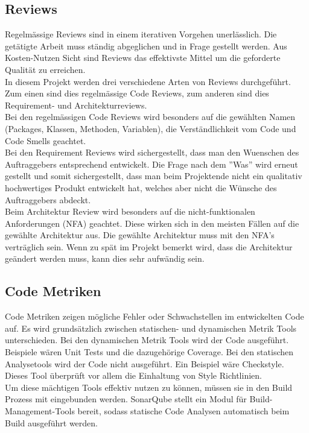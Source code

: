 \subsection{Reviews}
Regelmässige Reviews sind in einem iterativen Vorgehen unerlässlich. Die getätigte Arbeit muss ständig abgeglichen und in Frage gestellt werden. Aus Kosten-Nutzen Sicht sind Reviews das effektivste Mittel um die geforderte Qualität zu erreichen.\\ 

\noindent In diesem Projekt werden drei verschiedene Arten von Reviews durchgeführt. Zum einen sind dies regelmässige Code Reviews, zum anderen sind dies Requirement- und Architekturreviews.\\

\noindent Bei den regelmässigen Code Reviews wird besonders auf die gewählten Namen (Packages, Klassen, Methoden, Variablen), die Verständlichkeit vom Code und Code Smells geachtet.\\

\noindent Bei den Requirement Reviews wird sichergestellt, dass man den Wuenschen des Auftraggebers entsprechend entwickelt. Die Frage nach dem ''Was'' wird erneut gestellt und somit sichergestellt, dass man beim Projektende nicht ein qualitativ hochwertiges Produkt entwickelt hat, welches aber nicht die Wünsche des Auftraggebers abdeckt.\\ 

\noindent Beim Architektur Review wird besonders auf die nicht-funktionalen Anforderungen (NFA) geachtet. Diese wirken sich in den meisten Fällen auf die gewählte Architektur aus. Die gewählte Architektur muss mit den NFA's verträglich sein. Wenn zu spät im Projekt bemerkt wird, dass die Architektur geändert werden muss, kann dies sehr aufwändig sein.
\subsection{Code Metriken}
Code Metriken zeigen mögliche Fehler oder Schwachstellen im entwickelten Code auf. Es wird grundsätzlich zwischen statischen- und dynamischen Metrik Tools unterschieden. Bei den dynamischen Metrik Tools wird der Code ausgeführt. Beispiele wären Unit Tests und die dazugehörige Coverage. Bei den statischen Analysetools wird der Code nicht ausgeführt. Ein Beispiel wäre Checkstyle. Dieses Tool überprüft vor allem die Einhaltung von Style Richtlinien.\\

\noindent Um diese mächtigen Tools effektiv nutzen zu können, müssen sie in den Build Prozess mit eingebunden werden. SonarQube stellt ein Modul für Build-Management-Tools bereit, sodass statische Code Analysen automatisch beim Build ausgeführt werden.